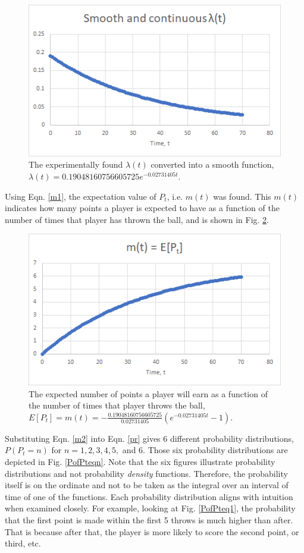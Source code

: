 \documentclass{article}
\begin{document}
\begin{figure}
	\centering
	\includegraphics[width=0.7\linewidth]{smoothlambda}
	\caption{The experimentally found $\lambda(t)$ converted into a smooth function, $\lambda(t) = 0.19048160756605725e^{-0.02731405t}$.}
	\label{smoothlambda}
\end{figure}

Using Eqn. \ref{m1}, the expectation value of $P_t$, i.e. $m(t)$ was found. This $m(t)$ indicates how many points a player is expected to have as a function of the number of times that player has thrown the ball, and is shown in Fig. \ref{m}.

\begin{figure}
	\centering
	\includegraphics[width=0.7\linewidth]{m}
	\caption{The expected number of points a player will earn as a function of the number of times that player throws the ball, $E[P_t] = m(t) = -\frac{0.19048160756605725}{0.02731405}(e^{-0.02731405t} - 1)$.}
	\label{m}
\end{figure}

Substituting Eqn. \ref{m2} into Eqn. \ref{pr} gives 6 different probability distributions, $P(P_t = n)$ for $n = 1, 2, 3, 4, 5,$ and $6$. Those six probability distributions are depicted in Fig. \ref{PofPteqn}. Note that the six figures illustrate probability distributions and not probability \textit{density} functions. Therefore, the probability itself is on the ordinate and not to be taken as the integral over an interval of time of one of the functions. Each probability distribution aligns with intuition when examined closely. For example, looking at Fig. \ref{PofPteq1}, the probability that the first point is made within the first 5 throws is much higher than after. That is because after that, the player is more likely to score the second point, or third, etc. 
\end{document}
